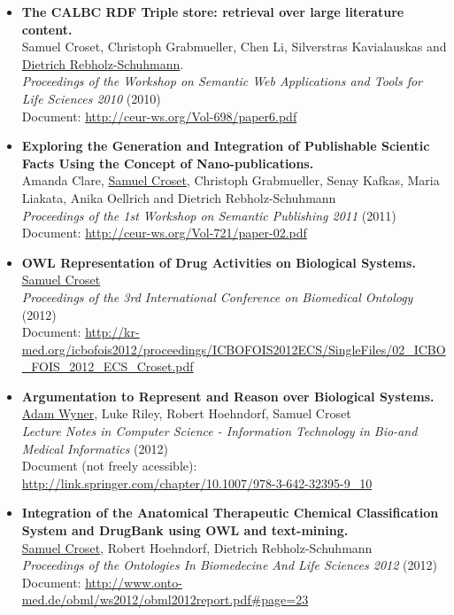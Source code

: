 \begin{itemize}
  \item \textbf{The CALBC RDF Triple store: retrieval over large literature content.} \\ Samuel Croset, Christoph Grabmueller, Chen Li, Silverstras Kavialauskas and \underline{Dietrich Rebholz-Schuhmann}. \\ \emph{Proceedings of the Workshop on Semantic Web Applications and Tools for Life Sciences 2010} (2010) \\ Document: \url{http://ceur-ws.org/Vol-698/paper6.pdf}
  \item \textbf{Exploring the Generation and Integration of Publishable Scientic Facts Using the Concept of Nano-publications.} \\ Amanda Clare, \underline{Samuel Croset}, Christoph Grabmueller, Senay Kafkas, Maria Liakata, Anika Oellrich and Dietrich Rebholz-Schuhmann \\ \emph{Proceedings of the 1st Workshop on Semantic Publishing 2011} (2011) \\ Document: \url{http://ceur-ws.org/Vol-721/paper-02.pdf}
  \item \textbf{OWL Representation of Drug Activities on Biological Systems.} \\ \underline{Samuel Croset} \\ \emph{Proceedings of the 3rd International Conference on Biomedical Ontology} (2012) \\ Document: \url{http://kr-med.org/icbofois2012/proceedings/ICBOFOIS2012ECS/SingleFiles/02_ICBO_FOIS_2012_ECS_Croset.pdf}
  \item \textbf{Argumentation to Represent and Reason over Biological Systems.} \\ \underline{Adam Wyner}, Luke Riley, Robert Hoehndorf, Samuel Croset \\ \emph{Lecture Notes in Computer Science - Information Technology in Bio-and Medical Informatics} (2012) \\ Document (not freely acessible): \url{http://link.springer.com/chapter/10.1007/978-3-642-32395-9_10}
  \item \textbf{Integration of the Anatomical Therapeutic Chemical Classification System and DrugBank using OWL and text-mining.} \\ \underline{Samuel Croset}, Robert Hoehndorf, Dietrich Rebholz-Schuhmann \\ \emph{Proceedings of the Ontologies In Biomedecine And Life Sciences 2012} (2012) \\ Document: \url{http://www.onto-med.de/obml/ws2012/obml2012report.pdf#page=23}

\end{itemize}
